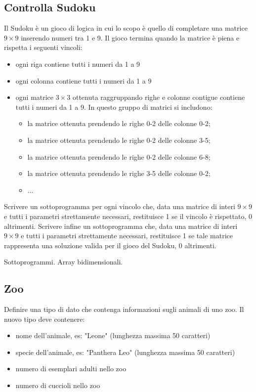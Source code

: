 \subsection{Controlla Sudoku}
Il Sudoku \`e un gioco di logica in cui lo scopo \`e quello di completare una matrice $9 \times 9$ inserendo numeri tra 1 e 9.
Il gioco termina quando la matrice \`e piena e rispetta i seguenti vincoli:
\begin{itemize}
    \item ogni riga contiene tutti i numeri da 1 a 9
    \item ogni colonna contiene tutti i numeri da 1 a 9
    \item ogni matrice $3 \times 3$ ottenuta raggruppando righe e colonne contigue contiene tutti i numeri da 1 a 9.
      In questo gruppo di matrici si includono:
      \begin{itemize}
          \item la matrice ottenuta prendendo le righe 0-2 delle colonne 0-2;
          \item la matrice ottenuta prendendo le righe 0-2 delle colonne 3-5;
          \item la matrice ottenuta prendendo le righe 0-2 delle colonne 6-8;
          \item la matrice ottenuta prendendo le righe 3-5 delle colonne 0-2;
          \item ...
      \end{itemize}
\end{itemize}

Scrivere un sottoprogramma per ogni vincolo che, data una matrice di interi $9 \times 9$
e tutti i parametri strettamente necessari, restituisce 1 se il vincolo \`e rispettato, 0 altrimenti.
Scrivere infine un sottoprogramma che, data una matrice di interi $9 \times 9$ e tutti i parametri strettamente necessari, 
restituisce 1 se tale matrice rappresenta una soluzione valida per il gioco del Sudoku, 0 altrimenti.

\begin{tags}
Sottoprogrammi. Array bidimensionali.
\end{tags}


\subsection{Zoo}
Definire una tipo di dato che contenga informazioni sugli animali di uno zoo.
Il nuovo tipo deve contenere:
\begin{itemize}
    \item nome dell'animale, es: "Leone" (lunghezza massima 50 caratteri)
    \item specie dell'animale, es: "Panthera Leo" (lunghezza massima 50 caratteri)
    \item numero di esemplari adulti nello zoo
    \item numero di cuccioli nello zoo
\end{itemize}

